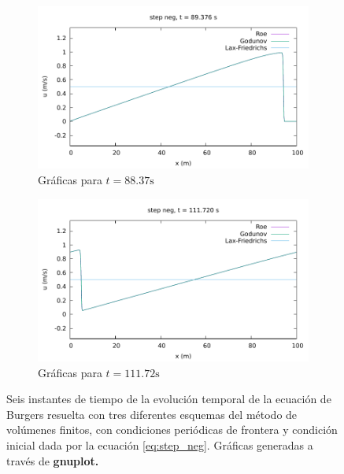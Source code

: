 \documentclass[12pt]{article}
\begin{document}
\begin{figure}[h!]
\begin{subfigure}{0.49\textwidth}
			\includegraphics[width=\textwidth]{../burgers1DVF/results/sol_periodicas/step_neg/084.pdf}
			\caption*{Gráficas para $t=88.37\unit{\second}$}
			\label{fig:step_neg-perio5}
		\end{subfigure}\hfill
		\begin{subfigure}{0.49\textwidth}
			\centering
			\includegraphics[width=\textwidth]{../burgers1DVF/results/sol_periodicas/step_neg/105.pdf}
			\caption*{Gráficas para $t=111.72\unit{\second}$}
			\label{fig:step_neg-perio6}
		\end{subfigure}
		\caption{Seis instantes de tiempo de la evolución temporal de  la ecuación de Burgers resuelta con tres diferentes esquemas del método de volúmenes finitos, con condiciones periódicas de frontera y condición inicial dada por la ecuación \ref{eq:step_neg}. Gráficas generadas a través de \textbf{gnuplot.}}
		\label{fig:step_neg-periodica}
	\end{figure}
\end{document}
